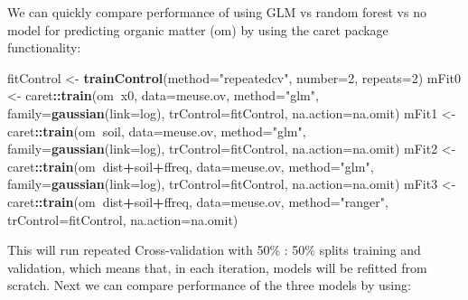 \documentclass[graybox,natbib,nospthms,UStrade]{svmono}
\newenvironment{Shaded}{\begin{snugshade}}{\end{snugshade}}
\newcommand{\DataTypeTok}[1]{\textcolor[rgb]{0.27,0.27,0.27}{#1}}
\newcommand{\DecValTok}[1]{\textcolor[rgb]{0.06,0.06,0.06}{#1}}
\newcommand{\KeywordTok}[1]{\textcolor[rgb]{0.27,0.27,0.27}{\textbf{#1}}}
\newcommand{\NormalTok}[1]{#1}
\newcommand{\OperatorTok}[1]{\textcolor[rgb]{0.43,0.43,0.43}{\textbf{#1}}}
\newcommand{\StringTok}[1]{\textcolor[rgb]{0.5,0.5,0.5}{#1}}
\begin{document}
We can quickly compare performance of using GLM vs random forest vs no model for predicting organic matter (om) by using the caret package functionality:

\begin{Shaded}
\begin{Highlighting}[]
\NormalTok{fitControl <-}\StringTok{ }\KeywordTok{trainControl}\NormalTok{(}\DataTypeTok{method=}\StringTok{"repeatedcv"}\NormalTok{, }\DataTypeTok{number=}\DecValTok{2}\NormalTok{, }\DataTypeTok{repeats=}\DecValTok{2}\NormalTok{)}
\NormalTok{mFit0 <-}\StringTok{ }\NormalTok{caret}\OperatorTok{::}\KeywordTok{train}\NormalTok{(om}\OperatorTok{~}\NormalTok{x0, }\DataTypeTok{data=}\NormalTok{meuse.ov, }\DataTypeTok{method=}\StringTok{"glm"}\NormalTok{, }
               \DataTypeTok{family=}\KeywordTok{gaussian}\NormalTok{(}\DataTypeTok{link=}\NormalTok{log), }\DataTypeTok{trControl=}\NormalTok{fitControl, }
               \DataTypeTok{na.action=}\NormalTok{na.omit)}
\NormalTok{mFit1 <-}\StringTok{ }\NormalTok{caret}\OperatorTok{::}\KeywordTok{train}\NormalTok{(om}\OperatorTok{~}\NormalTok{soil, }\DataTypeTok{data=}\NormalTok{meuse.ov, }\DataTypeTok{method=}\StringTok{"glm"}\NormalTok{, }
               \DataTypeTok{family=}\KeywordTok{gaussian}\NormalTok{(}\DataTypeTok{link=}\NormalTok{log), }\DataTypeTok{trControl=}\NormalTok{fitControl, }
               \DataTypeTok{na.action=}\NormalTok{na.omit)}
\NormalTok{mFit2 <-}\StringTok{ }\NormalTok{caret}\OperatorTok{::}\KeywordTok{train}\NormalTok{(om}\OperatorTok{~}\NormalTok{dist}\OperatorTok{+}\NormalTok{soil}\OperatorTok{+}\NormalTok{ffreq, }\DataTypeTok{data=}\NormalTok{meuse.ov, }\DataTypeTok{method=}\StringTok{"glm"}\NormalTok{, }
               \DataTypeTok{family=}\KeywordTok{gaussian}\NormalTok{(}\DataTypeTok{link=}\NormalTok{log), }\DataTypeTok{trControl=}\NormalTok{fitControl, }
               \DataTypeTok{na.action=}\NormalTok{na.omit)}
\NormalTok{mFit3 <-}\StringTok{ }\NormalTok{caret}\OperatorTok{::}\KeywordTok{train}\NormalTok{(om}\OperatorTok{~}\NormalTok{dist}\OperatorTok{+}\NormalTok{soil}\OperatorTok{+}\NormalTok{ffreq, }\DataTypeTok{data=}\NormalTok{meuse.ov, }\DataTypeTok{method=}\StringTok{"ranger"}\NormalTok{, }
               \DataTypeTok{trControl=}\NormalTok{fitControl, }\DataTypeTok{na.action=}\NormalTok{na.omit)}
\end{Highlighting}
\end{Shaded}

This will run repeated Cross-validation with 50\% : 50\% splits training and validation,
which means that, in each iteration, models will be refitted from scratch. Next we can compare performance of the three models by using:
\end{document}
